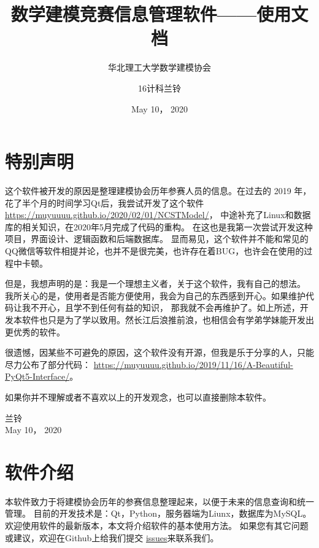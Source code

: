 \documentclass[cn, 11pt, chinese, show]{elegantbook}
\title{数学建模竞赛信息管理软件——使用文档}
\subtitle{华北理工大学数学建模协会}
\author{16计科兰铃}
\date{May 10， 2020}
\begin{document}
\maketitle
\frontmatter

\chapter*{特别声明}

这个软件被开发的原因是整理建模协会历年参赛人员的信息。在过去的 2019 年，花了半个月的时间学习Qt后，我尝试开发了这个软件
 \href{https://muyuuuu.github.io/2020/02/01/NCSTModel/}{https://muyuuuu.github.io/2020/02/01/N\-CSTModel/}，
中途补充了Linux和数据库的相关知识，在2020年5月完成了代码的重构。
在这也是我第一次尝试开发这种项目，界面设计、逻辑函数和后端数据库。
显而易见，这个软件并不能和常见的QQ微信等软件相提并论，也并不是很完美，也许存在着BUG，也许会在使用的过程中卡顿。

但是，我想声明的是：我是一个理想主义者，关于这个软件，我有自己的想法。
我所关心的是，使用者是否能方便使用，我会为自己的东西感到开心。如果维护代码让我不开心，且学不到任何有益的知识，
那我就不会再维护了。如上所述，开发本软件也只是为了学以致用。然长江后浪推前浪，也相信会有学弟学妹能开发出更优秀的软件。

很遗憾，因某些不可避免的原因，这个软件没有开源，但我是乐于分享的人，只能尽力公布了部分代码：
\href{https://muyuuuu.github.io/2019/11/16/A-Beautiful-PyQt5-Interface/}{https://muyuuuu.github.io/2019/11/16/A-Beautiful-PyQt5-Interface/}。

如果你并不理解或者不喜欢以上的开发观念，也可以直接删除本软件。

\vskip 1.5cm

\begin{flushright}
兰铃\\
May 10， 2020
\end{flushright}

\tableofcontents

\mainmatter
\chapter{软件介绍}

本软件致力于将建模协会历年的参赛信息整理起来，以便于未来的信息查询和统一管理。
目前的开发技术是：Qt，Python，服务器端为Liunx，数据库为MySQL。欢迎使用软件的最新版本，本文将介绍软件的基本使用方法。
如果您有其它问题或建议，欢迎在Github上给我们提交
 \href{https://github.com/muyuuuu/NCST-MMA-Contest-Management-System-Public}{issues}来联系我们。
\end{document}

